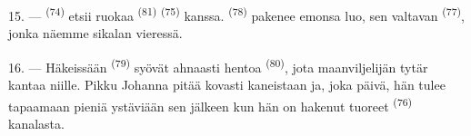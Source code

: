 15. ---  \textsuperscript{(74)} etsii ruokaa
 \textsuperscript{(81)} 
\textsuperscript{(75)} kanssa.  \textsuperscript{(78)} pakenee
emonsa luo, sen valtavan  \textsuperscript{(77)}, jonka näemme
sikalan vieressä.

16. --- Häkeissään  \textsuperscript{(79)} syövät ahnaasti hentoa
 \textsuperscript{(80)}, jota maanviljelijän tytär kantaa niille.
Pikku Johanna pitää kovasti kaneistaan ja, joka päivä, hän tulee tapaamaan
pieniä ystäviään sen jälkeen kun hän on hakenut tuoreet 
\textsuperscript{(76)} kanalasta.
\VUsaut{6.0mm}
\VUfilet{22mm}
